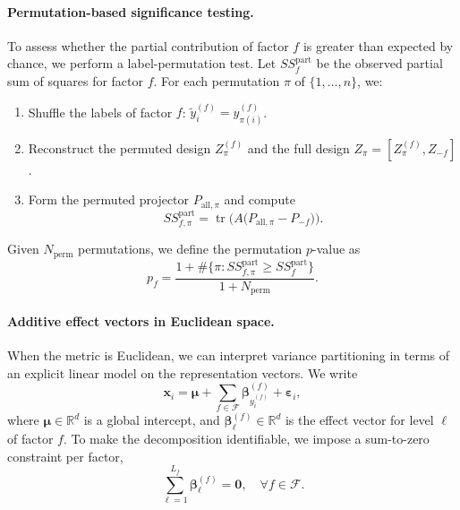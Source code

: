 \paragraph{Permutation-based significance testing.}
\begin{sloppypar}
To assess whether the partial contribution of factor $f$ is greater than expected by chance, we perform a label-permutation test. Let $SS_f^{\text{part}}$ be the observed partial sum of squares for factor $f$. For each permutation $\pi$ of $\{1,\dots,n\}$, we:
\end{sloppypar}

\begin{enumerate}
    \item Shuffle the labels of factor $f$: $\tilde{y}_i^{(f)} = y_{\pi(i)}^{(f)}$.
    \item Reconstruct the permuted design $Z_\pi^{(f)}$ and the full design $Z_\pi = [Z_\pi^{(f)}, Z_{-f}]$.
    \item Form the permuted projector $P_{\text{all},\pi}$ and compute
    \begin{equation}
        SS_{f,\pi}^{\text{part}} = \operatorname{tr}\!\big(A \big(P_{\text{all},\pi} - P_{-f}\big)\big).
    \end{equation}
\end{enumerate}

Given $N_{\text{perm}}$ permutations, we define the permutation $p$-value as
\begin{equation}
    p_f = \frac{1 + \#\{\pi: SS_{f,\pi}^{\text{part}} \geq SS_f^{\text{part}}\}}{1 + N_{\text{perm}}}.
\end{equation}

\paragraph{Additive effect vectors in Euclidean space.}
When the metric is Euclidean, we can interpret variance partitioning in terms of an explicit linear model on the representation vectors. We write
\begin{equation}
    \mathbf{x}_i = \boldsymbol{\mu} + \sum_{f \in \mathcal{F}} \boldsymbol{\beta}^{(f)}_{y_i^{(f)}} + \boldsymbol{\varepsilon}_i,
    \label{eq:additive-model}
\end{equation}
where $\boldsymbol{\mu} \in \mathbb{R}^d$ is a global intercept, and $\boldsymbol{\beta}^{(f)}_\ell \in \mathbb{R}^d$ is the effect vector for level $\ell$ of factor $f$. To make the decomposition identifiable, we impose a sum-to-zero constraint per factor,
\begin{equation}
    \sum_{\ell=1}^{L_f} \boldsymbol{\beta}^{(f)}_\ell = \mathbf{0}, \quad \forall f \in \mathcal{F}.
\end{equation}

